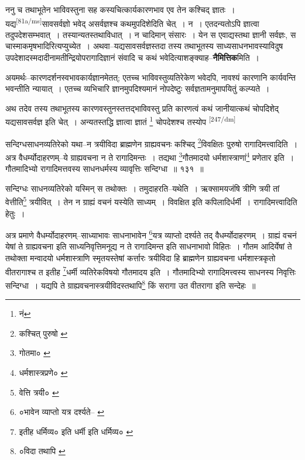 \documentclass[article,12pt,a4paper]{memoir}
\begin{document}
	  \pstart ननु च तथाभूतेन भाविवस्तुना सह कस्यचित्कार्यकारणभाव एव तेन कश्चिद् ज्ञातः । यद्य\leavevmode\textsuperscript{\rmlatinfont\tiny [81a/ms]}सावसर्वज्ञो भवेद् असर्वज्ञश्च कथमुपदिशेदिति चेत् । न । एतदन्यतोऽपि ज्ञात्वा तदुपदेशसम्भवात् । तस्यान्यतस्तथाविधात् । न चादिमान् संसारः । येन स एवाद्यस्तथा ज्ञानी सर्वज्ञः, स चास्माकमृषभादिरित्यप्युच्येत । अथवा--यद्यसावसर्वज्ञस्तदा तस्य तथाभूतस्य साध्यसाधनभावस्याविदुष उपदेशादस्मदादीनामतीन्द्रियोपरागादिज्ञानं संवादि च कथं भवेदित्याशङ्क्याह--\textbf{नैमित्तिक}मिति ।
	\pend
      

	  \pstart अयमर्थः--कारणदर्शनस्वभावकार्यज्ञानमेतत्; एतच्च भाविवस्तुव्यतिरेकेण भवेदपि, नावश्यं कारणानि कार्यवन्ति भवन्तीति न्यायात् । एतच्च व्यभिचारि ज्ञानमुपदिश्यमानं नोपदेष्टुः सर्वज्ञतामनुमापयितुं कल्प्यते ।
	\pend
      

	  \pstart अथ तदेव तस्य तथाभूतस्य कारणवस्तुनस्तत्तद्भाविवस्तु प्रति कारणत्वं कथं जानीयात्कथं चोपदिशेद् यद्यसावसर्वज्ञ इति चेत् । अन्यतस्तद्धि ज्ञात्वा ज्ञातं \footnote{नं} चोपदेशश्च तस्योप  \leavevmode\textsuperscript{\rmlatinfont\tiny [247/dm]} 
	  
	सन्दिग्धसाधनव्यतिरेको यथा--न त्रयीविदा ब्राह्मणेन ग्राह्यवचनः कश्चिद् \footnote{कश्चित् पुरुषो \cite{dp-msB} \cite{dp-edP} \cite{dp-edH} \cite{dp-edE}}विवक्षितः पुरुषो रागादिमत्त्वादिति । अत्र वैधर्म्योदाहरणम्--ये ग्राह्यवचना न ते रागादिमन्तः । तद्यथा \footnote{गोतमा० \cite{dp-msD}}गौतमादयो धर्मशास्त्राणां\footnote{धर्मशास्त्रप्रणे० \cite{dp-msC}} प्रणेतार इति । गौतमादिभ्यो रागादिमत्तवस्य साधनधर्मस्य व्यावृत्तिः सन्दिग्धा ॥ १३१ ॥ 
	  
	सन्दिग्धः साधनव्यतिरेको यस्मिन् स तथोक्तः । तमुदाहरति--यथेति । ऋक्सामयजंषि त्रीणि त्रयी तां वेत्तीति\footnote{वेत्ति त्रयी० \cite{dp-msA} \cite{dp-msB} \cite{dp-msD} \cite{dp-edP} \cite{dp-edH} \cite{dp-edE} \cite{dp-edN}} त्रयीवित् । तेन न ग्राह्यं वचनं यस्येति साध्यम् । विवक्षित इति कपिलादिर्धर्मी । रागादिमत्त्वादिति हेतुः । 
	  
	अत्र प्रमाणे वैधर्म्योदाहरणम्--साध्याभावः साधनाभावेन \footnote{०भावेन व्याप्तो यत्र दर्श्यते--\cite{dp-msA} \cite{dp-edP} \cite{dp-edH} \cite{dp-edE}}यत्र व्याप्तो दर्श्यते तद् वैधर्म्योदाहरणम् । ग्राह्यं वचनं येषां ते ग्राह्यवचना इति साध्यनिवृत्तिमनूद्य न ते रागादिमन्त इति साधनाभावो विहितः । गौतम आदिर्येषां ते तथोक्ता मन्वादयो धर्मशास्त्राणि स्मृतयस्तेषां कर्त्तारः त्रयीविदा हि ब्राह्मणेन ग्राह्यवचना धर्मशास्त्रकृतो वीतरागाश्च त इतीह \footnote{इतीह धर्मिव्य० \cite{dp-msC} \cite{dp-msD} इति धर्मी \cite{dp-msA} \cite{dp-edP} \cite{dp-edH} \cite{dp-edN} इति धर्मिव्य० \cite{dp-edE}}धर्मी व्यतिरेकविषयो गौतमादय इति । गौतमादिभ्यो रागादिमत्त्वस्य साधनस्य निवृत्तिः सन्दिग्धा । यद्यपि ते ग्राह्यवचनास्त्रयीविदस्तथापि\footnote{०विदा तथापि \cite{dp-msA} \cite{dp-edP} \cite{dp-edH} \cite{dp-edE} \cite{dp-edN}} किं सरागा उत वीतरागा इति सन्देहः ॥ 
	  
\end{document}

